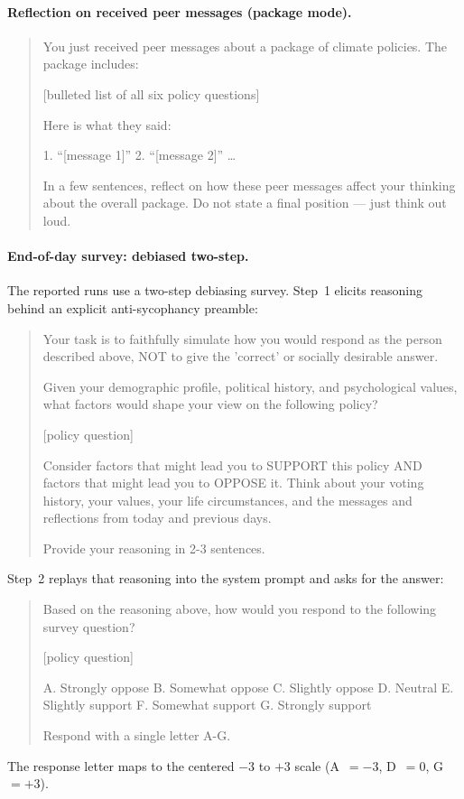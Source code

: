 \documentclass[pdflatex,sn-mathphys-num]{sn-jnl}%
\theoremstyle{thmstyleone}%
\theoremstyle{thmstyletwo}%
\theoremstyle{thmstylethree}%
\begin{document}
\paragraph{Reflection on received peer messages (package mode).}
\begin{quote}\small
You just received peer messages about a package of climate policies. The package
includes:

[bulleted list of all six policy questions]

Here is what they said:

1. ``[message 1]''
2. ``[message 2]''
\dots

In a few sentences, reflect on how these peer messages affect your thinking about
the overall package. Do not state a final position --- just think out loud.
\end{quote}

\paragraph{End-of-day survey: debiased two-step.}
The reported runs use a two-step debiasing survey. Step~1 elicits reasoning behind
an explicit anti-sycophancy preamble:
\begin{quote}\small
Your task is to faithfully simulate how you would respond as the person described
above, NOT to give the 'correct' or socially desirable answer.

Given your demographic profile, political history, and psychological values, what
factors would shape your view on the following policy?

[policy question]

Consider factors that might lead you to SUPPORT this policy AND factors that might
lead you to OPPOSE it. Think about your voting history, your values, your life
circumstances, and the messages and reflections from today and previous days.

Provide your reasoning in 2-3 sentences.
\end{quote}
Step~2 replays that reasoning into the system prompt and asks for the answer:
\begin{quote}\small
Based on the reasoning above, how would you respond to the following survey
question?

[policy question]

A. Strongly oppose \quad B. Somewhat oppose \quad C. Slightly oppose \quad
D. Neutral \quad E. Slightly support \quad F. Somewhat support \quad
G. Strongly support

Respond with a single letter A-G.
\end{quote}
The response letter maps to the centered $-3$ to $+3$ scale (A~$=-3$, D~$=0$,
G~$=+3$).
\end{document}
